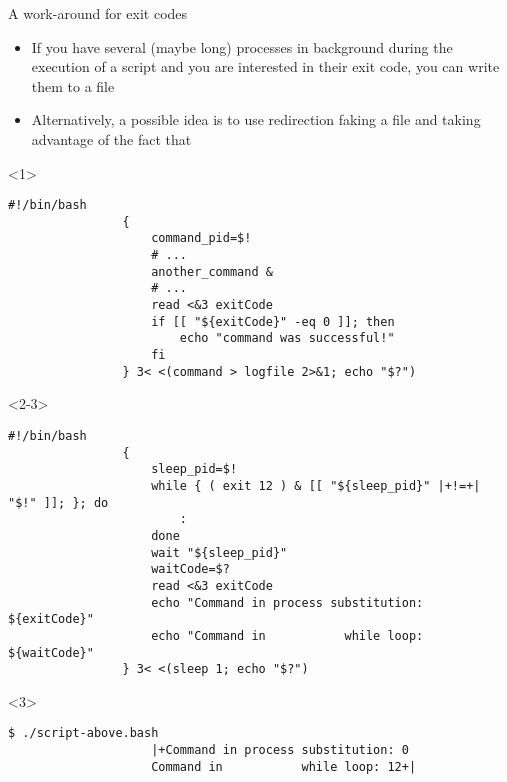 \begin{frame}[fragile]{A work-around for exit codes}
    \vspace{-1mm}
    \begin{overlayarea}{\textwidth}{\textheight}
        \begin{itemize}
            \item If you have several (maybe long) processes in background during the execution of a script and you are interested in their exit code, you can write them to a file
            \item Alternatively, a possible idea is to use redirection faking a file and taking advantage of the fact that 
        \end{itemize}
        \begin{onlyenv}<1>
            \begin{lstlisting}[style=MyBash, aboveskip=3mm, emph={[7]command_pid, exitCode}, emph={[8]another_command}]
                #!/bin/bash
                {
                    command_pid=$!
                    # ...
                    another_command &
                    # ...
                    read <&3 exitCode
                    if [[ "${exitCode}" -eq 0 ]]; then
                        echo "command was successful!"
                    fi
                } 3< <(command > logfile 2>&1; echo "$?")
            \end{lstlisting}
        \end{onlyenv}
        \begin{onlyenv}<2-3>
            \begin{lstlisting}[style=MyBash, aboveskip=3mm, emph={[7]sleep_pid, exitCode, waitCode}, firstnumber=12, xrightmargin=2mm]
                #!/bin/bash
                {
                    sleep_pid=$!
                    while { ( exit 12 ) & [[ "${sleep_pid}" |+!=+| "$!" ]]; }; do
                        :
                    done
                    wait "${sleep_pid}"
                    waitCode=$?
                    read <&3 exitCode
                    echo "Command in process substitution: ${exitCode}"
                    echo "Command in           while loop: ${waitCode}"
                } 3< <(sleep 1; echo "$?")
            \end{lstlisting}
            \begin{uncoverenv}<3>
                \begin{lstlisting}[style=MyBash, numbers=none, aboveskip=1mm, xrightmargin=2mm]
                    $ ./script-above.bash
                    |+Command in process substitution: 0
                    Command in           while loop: 12+|
                \end{lstlisting}
            \end{uncoverenv}
        \end{onlyenv}
    \end{overlayarea}
\end{frame}
